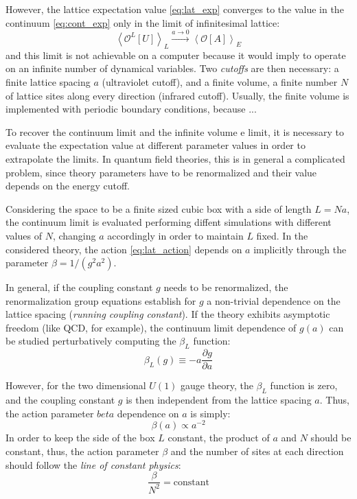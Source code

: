 However, the lattice expectation value \eqref{eq:lat_exp} converges to the value in the continuum \eqref{eq:cont_exp} only in the limit of infinitesimal lattice:
\begin{equation}\label{eq:cont_limit}
    \left<\mathcal O^L[U]\right>_L \xrightarrow{a\to0} \left<\mathcal O[A]\right>_E
\end{equation}
and this limit is not achievable on a computer because it would imply to operate on an infinite number of dynamical variables.
Two \emph{cutoffs} are then necessary: a finite lattice spacing $a$ (ultraviolet cutoff),
and a finite volume, \ie a finite number $N$ of lattice sites along every direction (infrared cutoff).
Usually, the finite volume is implemented with periodic boundary conditions, because ... 

To recover the continuum limit and the infinite volume e limit,
it is necessary to evaluate the expectation value at different parameter values in order to extrapolate the limits.
In quantum field theories, this is in general a complicated problem,
since theory parameters have to be renormalized and their value depends on the energy cutoff.

Considering the space to be a finite sized cubic box with a side of length $L=Na$,
the continuum limit is evaluated performing diffent simulations with different values of $N$, changing $a$ accordingly in order to maintain $L$ fixed.
In the considered theory, the action \eqref{eq:lat_action} depends on $a$ implicitly through the parameter $\beta = 1/(g^2a^2)$.

In general, if the coupling constant $g$ needs to be renormalized,
the renormalization group equations establish for $g$ a non-trivial dependence on the lattice spacing (\emph{running coupling constant}).
If the theory exhibits asymptotic freedom (like QCD, for example), the continuum limit dependence of $g(a)$ can be studied perturbatively computing the $\beta_L$ function:
\[
    \beta_L(g) \equiv -a\frac{\partial g}{\partial a}
\]

However, for the two dimensional $U(1)$ gauge theory, the $\beta_L$ function is zero, and the coupling constant $g$ is then independent from the lattice spacing $a$.
Thus, the action parameter $beta$ dependence on $a$ is simply:
\[
    \beta(a) \propto a^{-2}
\]
In order to keep the side of the box $L$ constant, the product of $a$ and $N$ should be constant,
thus, the action parameter $\beta$ and the number of sites at each direction should follow the \emph{line of constant physics}:
\begin{equation}\label{eq:const_phys}
    \frac{\beta}{N^2} = \text{constant}
\end{equation}

